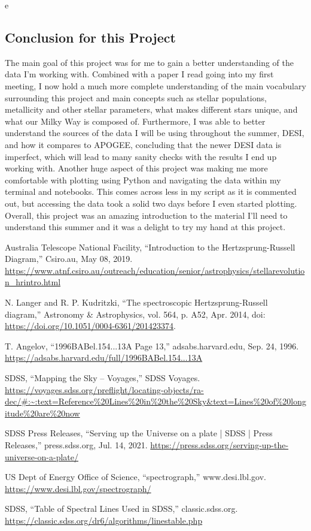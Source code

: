 e\documentclass{article}
\begin{document}
\subsection*{Conclusion for this Project}
\indent The main goal of this project was for me to gain a better understanding of the data I’m working with. Combined with a paper I read going into my first meeting, I now hold a much more complete understanding of the main vocabulary surrounding this project and main concepts such as stellar populations, metallicity and other stellar parameters, what makes different stars unique, and what our Milky Way is composed of. Furthermore, I was able to better understand the sources of the data I will be using throughout the summer, DESI, and how it compares to APOGEE, concluding that the newer DESI data is imperfect, which will lead to many sanity checks with the results I end up working with. Another huge aspect of this project was making me more comfortable with plotting using Python and navigating the data within my terminal and notebooks. This comes across less in my script as it is commented out, but accessing the data took a solid two days before I even started plotting. Overall, this project was an amazing introduction to the material I’ll need to understand this summer and it was a delight to try my hand at this project.

\newpage

\begin{thebibliography}{99}
    
Australia Telescope National Facility, “Introduction to the Hertzsprung-Russell Diagram,” Csiro.au, May 08, 2019. \url{https://www.atnf.csiro.au/outreach/education/senior/astrophysics/stellarevolution_hrintro.html}

N. Langer and R. P. Kudritzki, “The spectroscopic Hertzsprung-Russell diagram,” Astronomy \& Astrophysics, vol. 564, p. A52, Apr. 2014, doi: \url{https://doi.org/10.1051/0004-6361/201423374}.

T. Angelov, “1996BABel.154...13A Page 13,” adsabs.harvard.edu, Sep. 24, 1996. \url{https://adsabs.harvard.edu/full/1996BABel.154...13A}

SDSS, “Mapping the Sky – Voyages,” SDSS Voyages. \url{https://voyages.sdss.org/preflight/locating-objects/ra-dec/#:~:text=Reference%20Lines%20in%20the%20Sky&text=Lines%20of%20longitude%20are%20now}

SDSS Press Releases, “Serving up the Universe on a plate | SDSS | Press Releases,” press.sdss.org, Jul. 14, 2021. \url{https://press.sdss.org/serving-up-the-universe-on-a-plate/}

US Dept of Energy Office of Science, “spectrograph,” www.desi.lbl.gov. \url{https://www.desi.lbl.gov/spectrograph/}

SDSS, “Table of Spectral Lines Used in SDSS,” classic.sdss.org. \url{https://classic.sdss.org/dr6/algorithms/linestable.php}

\end{thebibliography}
\end{document}
